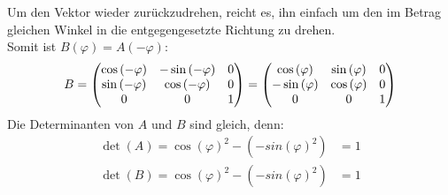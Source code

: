 \documentclass{theozettel}
\begin{document}
Um den Vektor wieder zurückzudrehen, reicht es, ihn einfach um den im Betrag gleichen Winkel in die entgegengesetzte Richtung zu drehen.\\
Somit ist $B\left(\varphi\right)=A\left(-\varphi\right)$:
\begin{align*}
B=\mqty(\cos\left(-\varphi\right) & -\sin\left(-\varphi\right) & 0 \\ \sin\left(-\varphi\right) & \cos\left(-\varphi\right) & 0\\ 0&0&1)=\mqty(\cos\left(\varphi\right) & \sin\left(\varphi\right) & 0 \\ -\sin\left(\varphi\right) & \cos\left(\varphi\right) & 0\\ 0&0&1)
\end{align*}
Die Determinanten von $A$ und $B$ sind gleich, denn:
\begin{align*}
\det\left(A\right)=\cos\left(\varphi\right)^2-\left(-sin\left(\varphi\right)^2\right)&=1\\
\det\left(B\right)=\cos\left(\varphi\right)^2-\left(-sin\left(\varphi\right)^2\right)&=1
\end{align*}
\end{document}
